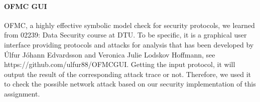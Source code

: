 \documentclass[conference]{IEEEtran}
\begin{document}
\paragraph{OFMC GUI}
OFMC, a highly effective symbolic model check for security protocols\cite{basin2005ofmc}, we learned from 02239: Data Security course at DTU. To be specific, it is a graphical user interface providing protocols and attacks for analysis that has been developed by \'{U}lfur J\'{o}hann Edvardsson and Veronica Julie Lodskov Hoffmann, see https://github.com/ulfur88/OFMCGUI. Getting the input protocol, it will output the result of the corresponding attack trace or not. Therefore, we used it to check the possible network attack based on our security implementation of this assignment.
\end{document}
